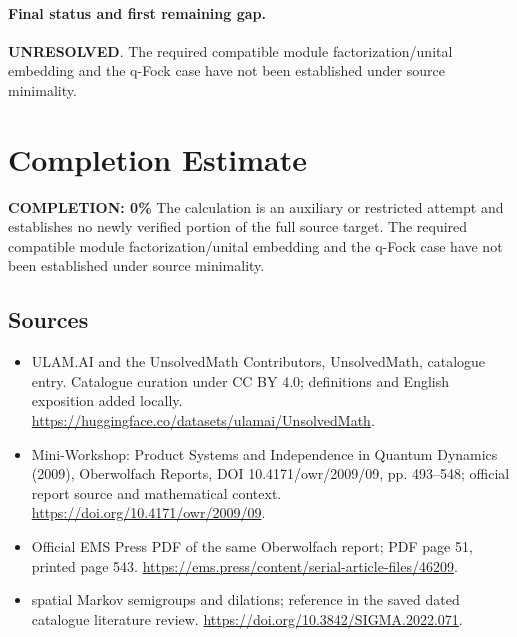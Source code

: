 \documentclass[11pt]{article}
\begin{document}
\paragraph{Final status and first remaining gap.}
\textbf{UNRESOLVED}. The required compatible module factorization/unital embedding and the q-Fock case have not been established under source minimality.

\section{Completion Estimate}
\noindent\textbf{COMPLETION: 0\%}
The calculation is an auxiliary or restricted attempt and establishes no newly verified portion of the full source target. The required compatible module factorization/unital embedding and the q-Fock case have not been established under source minimality.

\subsection{Sources}
\begin{itemize}
\item[\hypertarget{source:statement:1}{S1}] ULAM.AI and the UnsolvedMath Contributors, UnsolvedMath, catalogue entry. Catalogue curation under CC BY 4.0; definitions and English exposition added locally.
\url{https://huggingface.co/datasets/ulamai/UnsolvedMath}.
\item[\hypertarget{source:statement:2}{S2}] Mini-Workshop: Product Systems and Independence in Quantum Dynamics (2009), Oberwolfach Reports, DOI 10.4171/owr/2009/09, pp. 493--548; official report source and mathematical context.
\url{https://doi.org/10.4171/owr/2009/09}.
\item[\hypertarget{source:statement:3}{S3}] Official EMS Press PDF of the same Oberwolfach report; PDF page 51, printed page 543.
\url{https://ems.press/content/serial-article-files/46209}.
\item[\hypertarget{source:statement:4}{S4}] spatial Markov semigroups and dilations; reference in the saved dated catalogue literature review.
\url{https://doi.org/10.3842/SIGMA.2022.071}.
\end{itemize}
\label{end:statement}
\end{document}
